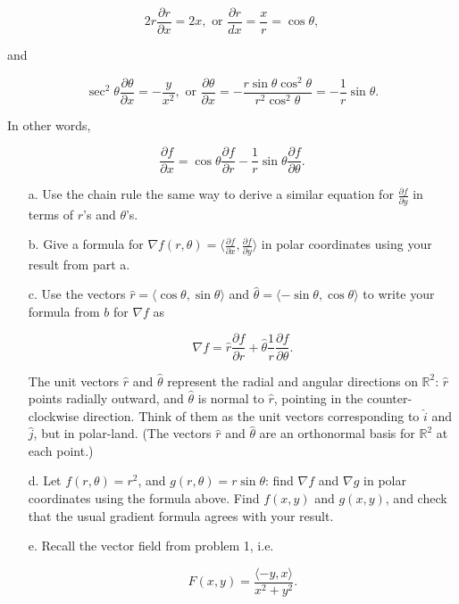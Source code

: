 \documentclass[11 pt]{report}
\begin{document}
\begin{enumerate}
$$2r \frac{\partial r}{\partial x} = 2x, \text{ or } \frac{\partial r}{d x} = \frac{x}{r} = \cos \theta,$$

and 

$$\sec^2 \theta \frac{\partial \theta}{\partial x} = -\frac{y}{x^2}, \text{ or } \frac{\partial \theta}{\partial x} = - \frac{r \sin \theta \cos^2\theta}{r^2 \cos^2 \theta} = - \frac{1}{r} \sin \theta.$$

In other words, 

$$\frac{\partial f}{\partial x} = \cos \theta \frac{\partial f}{\partial r} - \frac{1}{r} \sin \theta \frac{\partial f}{\partial \theta}.$$

\begin{enumerate} \item[a.] Use the chain rule the same way to derive a similar equation for $\frac{\partial f}{\partial y}$ in terms of $r$'s and $\theta$'s. 

\item[b.] Give a formula for $\nabla f(r, \theta) = \langle \frac{\partial f}{\partial x}, \frac{\partial f}{\partial y} \rangle$ in polar coordinates using your result from part a.

\item[c.] Use the vectors $\hat{r} = \langle \cos \theta, \sin \theta \rangle$ and $\hat{\theta} = \langle -\sin \theta, \cos \theta \rangle$ to write your formula from $b$ for $\nabla f$ as 

$$\nabla f = \hat{r} \frac{\partial f}{\partial r} + \hat{\theta} \frac{1}{r} \frac{\partial f}{\partial \theta}.$$

The unit vectors $\hat{r}$ and $\hat{\theta}$ represent the radial and angular directions on $\mathbb{R}^2$: $\hat{r}$ points radially outward, and $\hat{\theta}$ is normal to $\hat{r}$, pointing in the counter-clockwise direction. Think of them as the unit vectors corresponding to $\hat{i}$ and $\hat{j}$, but in polar-land. (The vectors $\hat{r}$ and $\hat{\theta}$ are an orthonormal basis for $\mathbb{R}^2$ at each point.)

\item[d.] Let $f(r, \theta) = r^2$, and $g(r, \theta) = r \sin \theta$: find $\nabla f$ and $\nabla g$ in polar coordinates using the formula above. Find $f(x,y)$ and $g(x,y)$, and check that the usual gradient formula agrees with your result. 

\item[e.] Recall the vector field from problem 1, i.e. 

\[
F(x,y) = \frac{\langle -y, x \rangle}{x^2+y^2}.
\]


\end{enumerate}
\end{enumerate}
\end{document}
